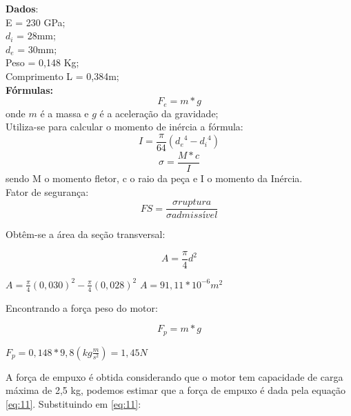 \indent \textbf{Dados}:\\
   \indent E = 230 GPa;\\
   \indent $d_i$ = 28mm;\\
   \indent $d_e$ = 30mm;\\
   \indent Peso = 0,148 Kg;\\
   \indent Comprimento L = 0,384m;\\
\indent \textbf{Fórmulas:}
      \begin{equation}
	F_e = m * g
	\label{eq:11}
      \end{equation}
      \indent onde $m$ é a massa e $g$ é a aceleração da gravidade;\\
   \indent Utiliza-se para calcular o momento de inércia a fórmula:\\
      \begin{equation}
	I= \frac{\pi}{64}( {d_e}^4 - {d_i}^4)
	\label{eq:12}
    \end{equation}
      \begin{equation}
	 \sigma = \frac{M*c}{I}
	\label{eq:13}
      \end{equation}
    \indent sendo M o momento fletor, c o raio da peça e I o momento da Inércia.\\
    \indent Fator de segurança:
    \begin{equation}
     FS= \frac{\sigma ruptura}{\sigma admissível}
     \label{eq:14}
    \end{equation}

Obtêm-se a área da seção transversal:

\begin{equation}
 A= \frac{\pi}{4} {d} ^ {2}
\end{equation}

\begin{center}
 $ A= \frac{\pi}{4} ({0,030}) ^ {2} -  \frac{\pi}{4} ({0,028}) ^ {2}$
 $ A = 91,11 * {10} ^ {-6}   {m} ^ {2}$
\end{center}
Encontrando a força peso do motor:

\begin{equation}
 F_p = m * g 
\end{equation}

\begin{center}
  $F_p = 0,148 * 9,8 (kg \frac{m}{s^2}) = 1,45N$
 
\end{center}

A força de empuxo é obtida considerando que o motor tem capacidade de carga máxima de 2,5 kg,
podemos estimar que a força de empuxo é dada pela equação \ref{eq:11}.
Substituindo em \ref{eq:11}: 


